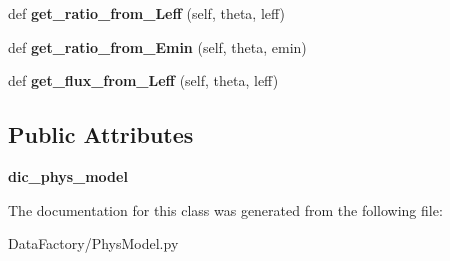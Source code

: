 \begin{DoxyCompactItemize}
\mbox{\label{classMIS_1_1DataFactory_1_1PhysModel_1_1PhysModelFromFormula_a958c72fc061208d7ad4f1e86cd9585cb}} 
def {\bfseries get\+\_\+ratio\+\_\+from\+\_\+\+Leff} (self, theta, leff)
\item 
\mbox{\label{classMIS_1_1DataFactory_1_1PhysModel_1_1PhysModelFromFormula_a85720c9fee78db4b19659abc582e93cf}} 
def {\bfseries get\+\_\+ratio\+\_\+from\+\_\+\+Emin} (self, theta, emin)
\item 
\mbox{\label{classMIS_1_1DataFactory_1_1PhysModel_1_1PhysModelFromFormula_a5eb1682c5c0ae4316408bf9151b358c4}} 
def {\bfseries get\+\_\+flux\+\_\+from\+\_\+\+Leff} (self, theta, leff)
\end{DoxyCompactItemize}
\subsection*{Public Attributes}
\begin{DoxyCompactItemize}
\item 
\mbox{\label{classMIS_1_1DataFactory_1_1PhysModel_1_1PhysModelFromFormula_aef2f108a9871bf67be1a294e398f1843}} 
{\bfseries dic\+\_\+phys\+\_\+model}
\end{DoxyCompactItemize}


The documentation for this class was generated from the following file\+:\begin{DoxyCompactItemize}
\item 
Data\+Factory/Phys\+Model.\+py\end{DoxyCompactItemize}
